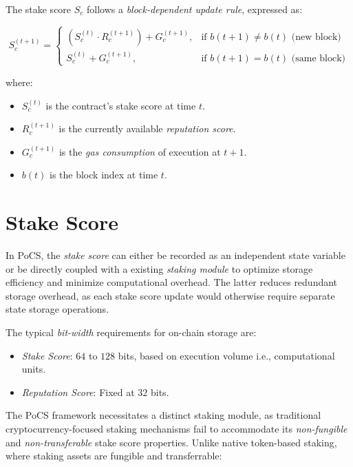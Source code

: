 \documentclass{article}
\begin{document}
The stake score $S_c$ follows a \textit{block-dependent update rule}, expressed as:  

\begin{equation}
S_c^{(t+1)} =
\begin{cases} 
(S_c^{(t)} \cdot R_c^{(t+1)}) + G_c^{(t+1)}, & \text{if } b(t+1) \neq b(t) \text{ (new block)} \\
S_c^{(t)} + G_c^{(t+1)}, & \text{if } b(t+1) = b(t) \text{ (same block)}
\end{cases}
\end{equation}

where:  
\begin{itemize}
    \item $S_c^{(t)}$ is the contract’s stake score at time $t$.  
    \item $R_c^{(t+1)}$ is the currently available \textit{reputation score}.  
    \item $G_c^{(t+1)}$ is the \textit{gas consumption} of execution at $t+1$.  
    \item $b(t)$ is the block index at time $t$.  
\end{itemize}

\section{Stake Score}

In PoCS, the \textit{stake score} can either be recorded as an independent state variable or be directly coupled with a existing \textit{staking module} to optimize storage efficiency and minimize computational overhead. The latter reduces redundant storage overhead, as each stake score update would otherwise require separate state storage operations.  

The typical \textit{bit-width} requirements for on-chain storage are:  
\begin{itemize}
\item \textit{Stake Score}: $64$ to $128$ bits, based on execution volume i.e., computational units.  
\item \textit{Reputation Score}: Fixed at $32$ bits.  
\end{itemize}

The PoCS framework necessitates a distinct staking module, as traditional cryptocurrency-focused staking mechanisms fail to accommodate its \textit{non-fungible} and \textit{non-transferable} stake score properties. Unlike native token-based staking, where staking assets are fungible and transferrable:  
\end{document}

